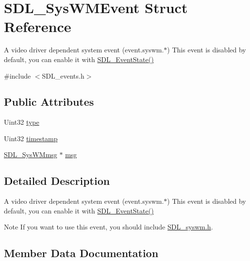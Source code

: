 \hypertarget{struct_s_d_l___sys_w_m_event}{}\section{S\+D\+L\+\_\+\+Sys\+W\+M\+Event Struct Reference}
\label{struct_s_d_l___sys_w_m_event}


A video driver dependent system event (event.\+syswm.$\ast$) This event is disabled by default, you can enable it with \mbox{\hyperlink{_s_d_l__events_8h_afb772893e1c46f186fa39a4defe76df3}{S\+D\+L\+\_\+\+Event\+State()}}  




{\ttfamily \#include $<$S\+D\+L\+\_\+events.\+h$>$}

\subsection*{Public Attributes}
\begin{DoxyCompactItemize}
\item 
Uint32 \mbox{\hyperlink{struct_s_d_l___sys_w_m_event_a84697e96cb16bf6a570e10b5bfdcd392}{type}}
\item 
Uint32 \mbox{\hyperlink{struct_s_d_l___sys_w_m_event_a5d3cb97006d99b620c2671c27bd82c06}{timestamp}}
\item 
\mbox{\hyperlink{struct_s_d_l___sys_w_mmsg}{S\+D\+L\+\_\+\+Sys\+W\+Mmsg}} $\ast$ \mbox{\hyperlink{struct_s_d_l___sys_w_m_event_ad5e3dc68aa15582cd0641847d41c74e8}{msg}}
\end{DoxyCompactItemize}


\subsection{Detailed Description}
A video driver dependent system event (event.\+syswm.$\ast$) This event is disabled by default, you can enable it with \mbox{\hyperlink{_s_d_l__events_8h_afb772893e1c46f186fa39a4defe76df3}{S\+D\+L\+\_\+\+Event\+State()}} 

\begin{DoxyNote}{Note}
If you want to use this event, you should include \mbox{\hyperlink{_s_d_l__syswm_8h}{S\+D\+L\+\_\+syswm.\+h}}. 
\end{DoxyNote}


\subsection{Member Data Documentation}
\mbox{\label{struct_s_d_l___sys_w_m_event_ad5e3dc68aa15582cd0641847d41c74e8}} 
